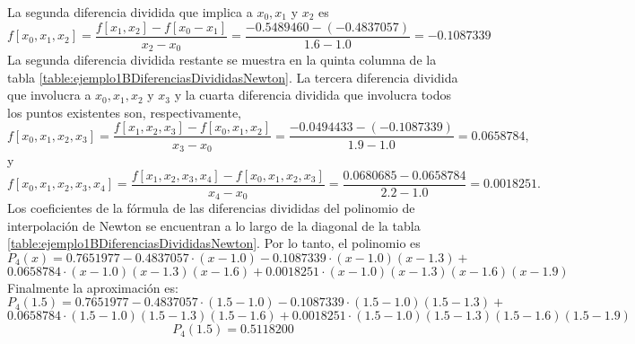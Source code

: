 \begin{exerciseT}
	La segunda diferencia dividida que implica a $x_0, x_1$ y $x_2$ es
	$$f[x_0,x_1,x_2] = \dfrac{f[x_1,x_2]-f[x_0-x_1]}{x_2-x_0} = \dfrac{-0.5489460-(-0.4837057)}{1.6 - 1.0} = -0.1087339$$
	La segunda diferencia dividida restante se muestra en la quinta columna de la tabla \ref{table:ejemplo1BDiferenciasDivididasNewton}. La tercera diferencia
	dividida que involucra a $x_0, x_1, x_2$ y $x_3$ y la cuarta diferencia dividida que involucra todos los puntos existentes son, respectivamente,
	$$f[x_0,x_1,x_2,x_3] = \dfrac{f[x_1,x_2,x_3]-f[x_0,x_1,x_2]}{x_3-x_0} = \dfrac{-0.0494433-(-0.1087339)}{1.9-1.0} = 0.0658784,$$
	y
	$$f[x_0,x_1,x_2,x_3,x_4] = \dfrac{f[x_1,x_2,x_3,x_4]-f[x_0,x_1,x_2,x_3]}{x_4-x_0} = \dfrac{0.0680685-0.0658784}{2.2-1.0} = 0.0018251.$$
	Los coeficientes de la fórmula de las diferencias divididas del polinomio de interpolación de Newton se encuentran a lo largo de la diagonal 
	de la tabla \ref{table:ejemplo1BDiferenciasDivididasNewton}. Por lo tanto, el polinomio es
	$$P_4(x) = 0.7651977 - 0.4837057\cdot(x-1.0) - 0.1087339\cdot(x-1.0)(x-1.3) + $$
	$$0.0658784\cdot(x-1.0)(x-1.3)(x-1.6) + 0.0018251\cdot(x-1.0)(x-1.3)(x-1.6)(x-1.9)$$
	Finalmente la aproximación es:
	$$P_4(1.5) = 0.7651977 - 0.4837057\cdot(1.5-1.0) - 0.1087339\cdot(1.5-1.0)(1.5-1.3) + $$
	$$0.0658784\cdot(1.5-1.0)(1.5-1.3)(1.5-1.6) + 0.0018251\cdot(1.5-1.0)(1.5-1.3)(1.5-1.6)(1.5-1.9)$$
	$$P_4(1.5) = 0.5118200$$ 
\end{exerciseT}
\hrulefill\\

